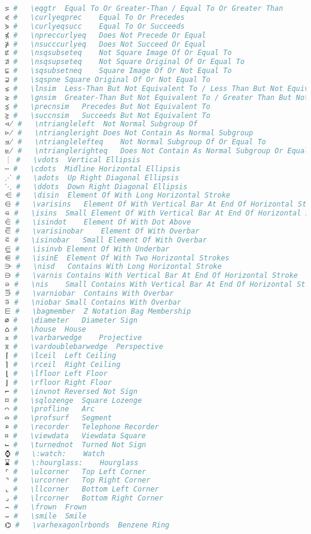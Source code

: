 \begin{lstlisting}[language=Julia, linewidth=\textwidth]
⋝ #   \eqgtr  Equal To Or Greater-Than / Equal To Or Greater Than
⋞ #   \curlyeqprec    Equal To Or Precedes
⋟ #   \curlyeqsucc    Equal To Or Succeeds
⋠ #   \npreccurlyeq   Does Not Precede Or Equal
⋡ #   \nsucccurlyeq   Does Not Succeed Or Equal
⋢ #   \nsqsubseteq    Not Square Image Of Or Equal To
⋣ #   \nsqsupseteq    Not Square Original Of Or Equal To
⋤ #   \sqsubsetneq    Square Image Of Or Not Equal To
⋥ #   \sqspne Square Original Of Or Not Equal To
⋦ #   \lnsim  Less-Than But Not Equivalent To / Less Than But Not Equivalent To
⋧ #   \gnsim  Greater-Than But Not Equivalent To / Greater Than But Not Equivalent To
⋨ #   \precnsim   Precedes But Not Equivalent To
⋩ #   \succnsim   Succeeds But Not Equivalent To
⋪ #   \ntriangleleft  Not Normal Subgroup Of
⋫ #   \ntriangleright Does Not Contain As Normal Subgroup
⋬ #   \ntrianglelefteq    Not Normal Subgroup Of Or Equal To
⋭ #   \ntrianglerighteq   Does Not Contain As Normal Subgroup Or Equal
⋮ #   \vdots  Vertical Ellipsis
⋯ #   \cdots  Midline Horizontal Ellipsis
⋰ #   \adots  Up Right Diagonal Ellipsis
⋱ #   \ddots  Down Right Diagonal Ellipsis
⋲ #   \disin  Element Of With Long Horizontal Stroke
⋳ #   \varisins   Element Of With Vertical Bar At End Of Horizontal Stroke
⋴ #   \isins  Small Element Of With Vertical Bar At End Of Horizontal Stroke
⋵ #   \isindot    Element Of With Dot Above
⋶ #   \varisinobar    Element Of With Overbar
⋷ #   \isinobar   Small Element Of With Overbar
⋸ #   \isinvb Element Of With Underbar
⋹ #   \isinE  Element Of With Two Horizontal Strokes
⋺ #   \nisd   Contains With Long Horizontal Stroke
⋻ #   \varnis Contains With Vertical Bar At End Of Horizontal Stroke
⋼ #   \nis    Small Contains With Vertical Bar At End Of Horizontal Stroke
⋽ #   \varniobar  Contains With Overbar
⋾ #   \niobar Small Contains With Overbar
⋿ #   \bagmember  Z Notation Bag Membership
⌀ #   \diameter   Diameter Sign
⌂ #   \house  House
⌅ #   \varbarwedge    Projective
⌆ #   \vardoublebarwedge  Perspective
⌈ #   \lceil  Left Ceiling
⌉ #   \rceil  Right Ceiling
⌊ #   \lfloor Left Floor
⌋ #   \rfloor Right Floor
⌐ #   \invnot Reversed Not Sign
⌑ #   \sqlozenge  Square Lozenge
⌒ #   \profline   Arc
⌓ #   \profsurf   Segment
⌕ #   \recorder   Telephone Recorder
⌗ #   \viewdata   Viewdata Square
⌙ #   \turnednot  Turned Not Sign
⌚ #   \:watch:    Watch
⌛ #   \:hourglass:    Hourglass
⌜ #   \ulcorner   Top Left Corner
⌝ #   \urcorner   Top Right Corner
⌞ #   \llcorner   Bottom Left Corner
⌟ #   \lrcorner   Bottom Right Corner
⌢ #   \frown  Frown
⌣ #   \smile  Smile
⌬ #   \varhexagonlrbonds  Benzene Ring

\end{lstlisting}
